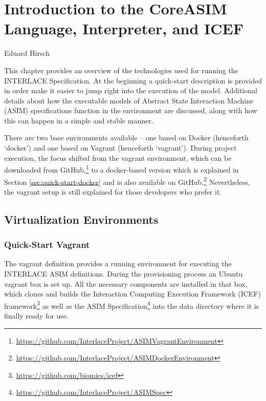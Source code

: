 \chapter{Introduction to the CoreASIM Language, Interpreter, and ICEF}
\label{ch:CoreAsimIntro}

\vspace{-1cm}
\begin{center}
Eduard Hirsch
\end{center}

This chapter provides an overview of the technologies used for running the INTERLACE Specification. At the beginning a quick-start description is provided in order make it easier to jump right into the execution of the model. Additional details about how the executable models of Abstract State Interaction Machine (ASIM) specifications function in the environment are discussed, along with how this can happen in a simple and stable manner.

There are two base environments available -- one based on Docker (henceforth `docker') and one based on Vagrant (henceforth `vagrant'). During project execution, the focus shifted from the vagrant environment, which can be downloaded from GitHub,\footnote{\url{https://github.com/InterlaceProject/ASIMVagrantEnvironment}} to a docker-based version which is explained in Section \ref{sec:quick-start-docker} and is also available on GitHub.\footnote{\url{https://github.com/InterlaceProject/ASIMDockerEnvironment}} Nevertheless, the vagrant setup is still explained for those developers who prefer it.

\section{Virtualization Environments}

\subsection{Quick-Start Vagrant}
\label{sec:quick-start-vagrant}

The vagrant definition provides a running environment for executing the INTERLACE ASIM definitions. During the provisioning process an Ubuntu vagrant box is set up. All the necessary components are installed in that box, which clones and builds the Interaction Computing Execution Framework (ICEF) framework\footnote{\url{https://github.com/biomics/icef}} as well as the ASIM Specification\footnote{\url{https://github.com/InterlaceProject/ASIMSpec}} into the data directory where it is finally ready for use.

